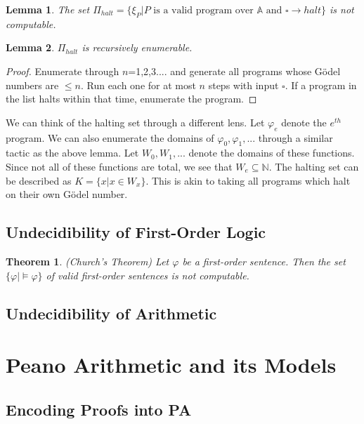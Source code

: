 \documentclass[a4paper,10pt]{article}
\newtheorem{theorem}{Theorem}[section]
\newtheorem{lemma}{Lemma}[section]
\let\phi\varphi
\newcommand*\NN{\mathbb{N}}
\newcommand*\map{\rightarrow}
\newcommand*\mo{\vDash}
\begin{document}
\begin{lemma}
The set $\Pi_{halt} = \{\xi_P \vert \text{$P$ is a valid program over $\mathbb{A}$ and $\square \map halt$}\}$ is not computable.
\end{lemma}

\begin{lemma}
 $\Pi_{halt}$ is recursively enumerable.
\end{lemma}

\begin{proof}
 Enumerate through $n$=1,2,3.... and generate all programs whose G\"{o}del numbers are $\leq n$. Run each one for at most $n$ steps with input $\square$. If a program in the list halts within that time,
 enumerate the program.
\end{proof}

 We can think of the halting set through a different lens. Let $\phi_e$ denote the $e^{th}$ program. We can also enumerate the domains of $\phi_0,\phi_1,...$ through a similar tactic as the above lemma.
 Let $W_0,W_1,...$ denote the domains of these functions. Since not all of these functions are total, we see that $W_e \subseteq \NN$. The halting set can be described as $K = \{x \vert x \in W_x\}$. This is akin to taking all programs which halt on their own G\"{o}del number.
\subsection{Undecidibility of First-Order Logic}

\begin{theorem}
 (Church's Theorem)
 Let $\phi$ be a first-order sentence. Then the set $\{\phi \vert \mo \phi\}$ of valid first-order sentences is not computable.
\end{theorem}

\subsection{Undecidibility of Arithmetic}


\newpage
\section{Peano Arithmetic and its Models}


\subsection{Encoding Proofs into PA}
\end{document}
